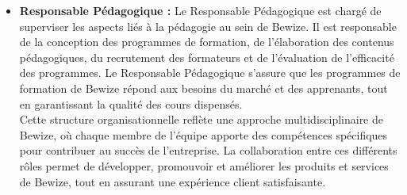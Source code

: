 \begin{itemize}
    \item[$\bullet$] \textbf{ Responsable Pédagogique :} Le Responsable Pédagogique est chargé de superviser les aspects liés à la pédagogie au sein de Bewize. Il est responsable de la conception des programmes de formation, de l'élaboration des contenus pédagogiques, du recrutement des formateurs et de l'évaluation de l'efficacité des programmes. Le Responsable Pédagogique s'assure que les programmes de formation de Bewize répond
    aux besoins du marché et des apprenants, tout en garantissant la qualité des cours dispensés. \\

    Cette structure organisationnelle reflète une approche multidisciplinaire de Bewize, où chaque membre de l'équipe apporte des compétences spécifiques pour contribuer au succès de l'entreprise. La collaboration entre ces différents rôles permet de développer, promouvoir et améliorer les produits et services de Bewize, tout en assurant une expérience client satisfaisante.


\end{itemize}
